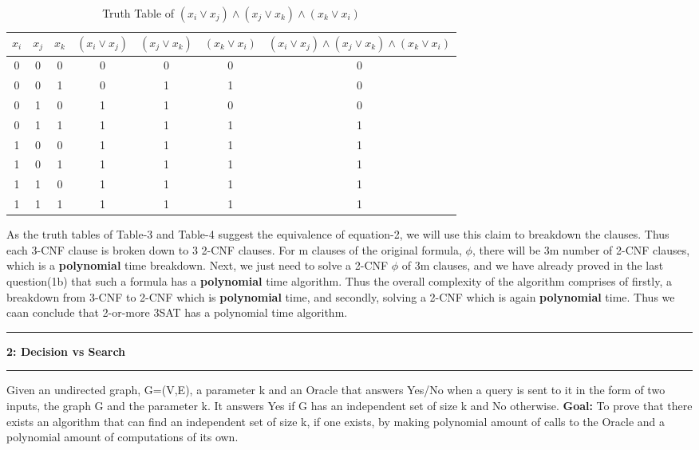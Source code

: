 \documentclass{article}
\newcommand\question[2]{\vspace{.25in}\hrule\textbf{#1: #2}\hrule\vspace{.10in}}
\begin{document}
\begin{table}[ht]
  \caption{Truth Table of $(x_{i} \vee x_{j}) \wedge (x_{j} \vee x_{k}) \wedge (x_{k} \vee x_{i})$}
  \centering
  \begin{tabular}{c c c c c c c}
  \hline\hline
  $x_{i}$ &  $x_{j}$ & $x_{k}$ & $(x_{i} \vee x_{j})$ & $(x_{j} \vee x_{k})$ & $(x_{k} \vee x_{i})$ & $(x_{i} \vee x_{j}) \wedge (x_{j} \vee x_{k}) \wedge (x_{k} \vee x_{i})$  \\[0.5ex]
  \hline
  0 & 0 & 0 & 0 & 0 & 0 & 0 \\
  0 & 0 & 1 & 0 & 1 & 1 & 0 \\
  0 & 1 & 0 & 1 & 1 & 0 & 0 \\
  0 & 1 & 1 & 1 & 1 & 1 & 1 \\
  1 & 0 & 0 & 1 & 1 & 1 & 1 \\
  1 & 0 & 1 & 1 & 1 & 1 & 1 \\
  1 & 1 & 0 & 1 & 1 & 1 & 1 \\
  1 & 1 & 1 & 1 & 1 & 1 & 1 \\ [0.5ex]
  \end{tabular}
  \label{table:nonlin}
  \end{table}

As the truth tables of Table-3 and Table-4 suggest the equivalence of equation-2, we will use this claim to breakdown the clauses. Thus each 3-CNF clause is broken down to 3 2-CNF clauses. For m clauses of the original formula, $\phi$, there will be 3m number of 2-CNF clauses, which is a \textbf {polynomial} time breakdown. Next, we just need to solve a 2-CNF $\phi$ of 3m clauses, and we have already proved in the last question(1b) that such a formula has a \textbf {polynomial} time algorithm. \newline
Thus the overall complexity of the algorithm comprises of firstly, a breakdown from 3-CNF to 2-CNF which is \textbf {polynomial} time, and secondly, solving a 2-CNF which is again \textbf {polynomial} time. Thus we caan conclude that 2-or-more 3SAT has a polynomial time algorithm. \newline

\question{2}{Decision vs Search}
Given an undirected graph, G=(V,E), a parameter k and an Oracle that answers Yes/No when a query is sent to it in the form of two inputs, the graph G and the parameter k. It answers Yes if G has an independent set of size k and No otherwise. \newline
\textbf {Goal:} To prove that there exists an algorithm that can find an independent set of size k, if one exists, by making polynomial amount of calls to the Oracle and a polynomial amount of computations of its own. 
\end{document}
